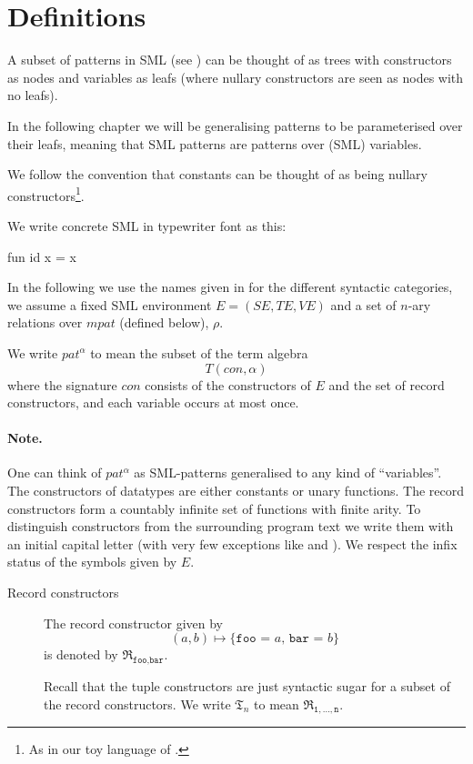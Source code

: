 \section{Definitions}\label{sec:definitions}
A subset of patterns in SML (see ) can be thought of as
trees with constructors as nodes and variables as leafs (where nullary
constructors are seen as nodes with no leafs).

In the following chapter we will be generalising patterns to be parameterised
over their leafs, meaning that SML patterns are patterns over (SML) variables.

We follow the convention that constants can be thought of as being nullary
constructors\footnote{As in our toy language of
  .}.

We write concrete SML in typewriter font as this:
\begin{sml}
fun id x = x
\end{sml}

In the following we use the names given in \cite{SML97} for the different
syntactic categories, we assume a fixed SML environment $E = (S\!E, T\!E, V\!E)$
and a set of $n$-ary relations over $mpat$ (defined below), $\rho$.

\begin{definition}
  We write $pat^\alpha$ to mean the subset of the term algebra
  \[
  T(con, \alpha)
  \]
  where the signature $con$ consists of the constructors of $E$ and the set of
  record constructors, and each variable occurs at most once.
\end{definition}

\paragraph{Note.} One can think of $pat^\alpha$ as SML-patterns generalised to
any kind of ``variables''. The constructors of datatypes are either constants or
unary functions. The record constructors form a countably infinite set of
functions with finite arity. To distinguish constructors from the surrounding
program text we write them with an initial capital letter (with very few
exceptions like \codeinline{::} and ). We respect the infix
status of the symbols given by $E$.

\begin{description}
\item[Record constructors] The record constructor given by
  \[
  (a, b) \mapsto \texttt{\{foo = $a$, bar = $b$\}}
  \]
  is denoted by $\mathfrak{R}_{\texttt{foo},\texttt{bar}}$.

  Recall that the tuple constructors are just syntactic sugar for a subset of
  the record constructors. We write $\mathfrak{T}_n$ to mean
  $\mathfrak{R}_{\texttt{1},\ldots,\texttt{n}}$.
\end{description}

